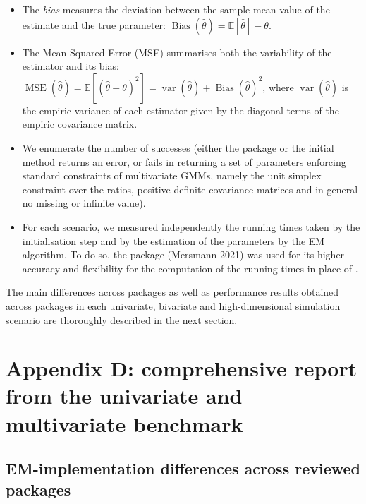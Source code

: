 \begin{itemize}
\item
  The \emph{bias} measures the deviation between the sample mean value of the
  estimate and the true parameter:
  \(\operatorname{Bias}(\hat{\theta})=\mathbb{E} [\hat{\theta}] - \theta\).
\item
  The Mean Squared Error (MSE) summarises both the variability of the
  estimator and its bias: \(\operatorname{MSE} (\hat{\theta})=\mathbb{E} \left[ (\hat{\theta} - \theta)^2 \right] = \operatorname{var}(\hat{\theta}) + \operatorname{Bias}(\hat{\theta})^2\), where \(\operatorname{var}(\hat{\theta})\) is the empiric variance of each
  estimator given by the diagonal terms of the empiric covariance matrix.
\item
  We enumerate the number of successes (either the package or the initial method returns an error, or fails in returning a set of parameters enforcing standard constraints of multivariate GMMs, namely the unit simplex constraint over the ratios, positive-definite covariance matrices and in general no missing or infinite value).
\item
  For each scenario, we measured independently the running times taken by the initialisation step and by the estimation of the parameters by the EM
  algorithm. To do so, the  package
  (Mersmann 2021) was used for its higher accuracy and flexibility for
  the computation of the running times in place of .
\end{itemize}

The main differences across packages as well as performance results obtained across packages in each univariate, bivariate and high-dimensional simulation scenario are thoroughly described in the next section.

\hypertarget{appendix-d-comprehensive-report-from-the-univariate-and-multivariate-benchmark}{%
\section{Appendix D: comprehensive report from the univariate and multivariate benchmark}\label{appendix-d-comprehensive-report-from-the-univariate-and-multivariate-benchmark}}

\hypertarget{em-implementation-differences-across-reviewed-packages}{%
\subsection{EM-implementation differences across reviewed packages}\label{em-implementation-differences-across-reviewed-packages}}

